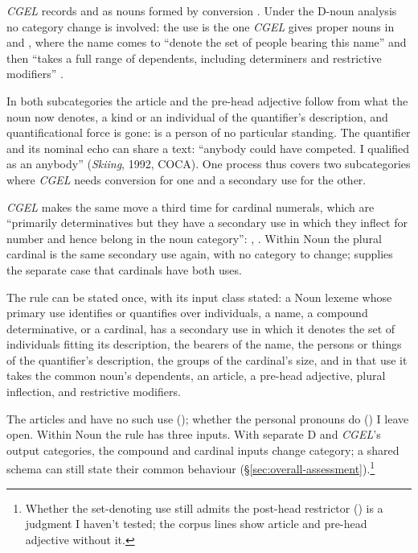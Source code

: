\documentclass[12pt]{article}
\begin{document}
\textit{CGEL} records  and  as nouns formed by conversion \citep[423, n.~43]{huddleston2002}. Under the D-noun analysis no category change is involved: the use is the one \textit{CGEL} gives proper nouns in  and , where the name comes to \enquote{denote the set of people bearing this name} and then \enquote{takes a full range of dependents, including determiners and restrictive modifiers} \citep[521]{huddleston2002}.

In both subcategories the article and the pre-head adjective follow from what the noun now denotes, a kind or an individual of the quantifier's description, and quantificational force is gone:  is a person of no particular standing. The quantifier and its nominal echo can share a text: \enquote{anybody could have competed. I qualified as an anybody} (\textit{Skiing}, 1992, COCA). One process thus covers two subcategories where \textit{CGEL} needs conversion for one and a secondary use for the other.

\textit{CGEL} makes the same move a third time for cardinal numerals, which are \enquote{primarily determinatives but they have a secondary use in which they inflect for number and hence belong in the noun category}: ,  \citep[385]{huddleston2002}. Within Noun the plural cardinal is the same secondary use again, with no category to change; \textcite{reynolds2026numerals} supplies the separate case that cardinals have both uses.

The rule can be stated once, with its input class stated: a Noun lexeme whose primary use identifies or quantifies over individuals, a name, a compound determinative, or a cardinal, has a secondary use in which it denotes the set of individuals fitting its description, the bearers of the name, the persons or things of the quantifier's description, the groups of the cardinal's size, and in that use it takes the common noun's dependents, an article, a pre-head adjective, plural inflection, and restrictive modifiers.

The articles and  have no such use (); whether the personal pronouns do () I leave open. Within Noun the rule has three inputs. With separate D and \textit{CGEL}'s output categories, the compound and cardinal inputs change category; a shared schema can still state their common behaviour (§\ref{sec:overall-assessment}).\footnote{Whether the set-denoting use still admits the post-head restrictor () is a judgment I haven't tested; the corpus lines show article and pre-head adjective without it.}
\end{document}
